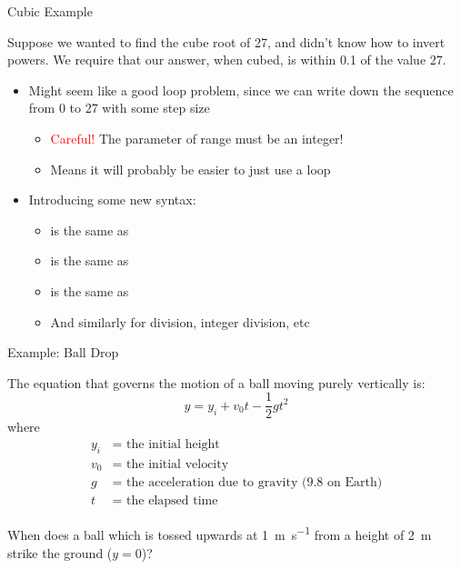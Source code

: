 \documentclass[pdf, aspectratio=169, 12pt]{beamer}
\begin{document}
\begin{frame}{Cubic Example}
	\begin{example}
		Suppose we wanted to find the cube root of 27, and didn't know how to invert powers. We require that our answer, when cubed, is within 0.1 of the value 27.
	\end{example}
	\pause
	\begin{itemize}
		\item<2-> Might seem like a good  loop problem, since we can write down the sequence from 0 to 27 with some step size
			\begin{itemize}
				\item \textcolor{Red}{Careful!} The  parameter of range must be an integer!
				\item Means it will probably be easier to just use a  loop
			\end{itemize}
		\item<3-> Introducing some new syntax:
			\begin{itemize}
				\item {} is the same as 
				\item {} is the same as 
				\item {} is the same as 
				\item And similarly for division, integer division, etc
			\end{itemize}
	\end{itemize}
\end{frame}

\begin{frame}{Example: Ball Drop}
	\begin{example}
		\footnotesize
		The equation that governs the motion of a ball moving purely vertically is:
		\[y = y_i + v_0 t - \frac{1}{2}gt^2\]
		where
		\begin{align*}
			y_i &= \text{ the initial height}\\
			v_0 &= \text{ the initial velocity}\\
			g &= \text{ the acceleration due to gravity (9.8 on Earth)}\\
			t &= \text{ the elapsed time}
		\end{align*}

		When does a ball which is tossed upwards at \SI{1}{\meter\per\second} from a height of \SI{2}{\meter} strike the ground ($y=0$)?
		
	\end{example}
\end{frame}
\end{document}
